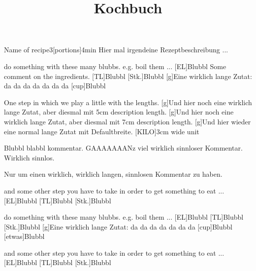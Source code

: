 \documentclass[ngerman,parskip=full]{scrartcl}
\title{Kochbuch}
\begin{document}
\maketitle

\begin{recipe}{Name of recipe}{3}[portions]{4min}
  Hier mal irgendeine Rezeptbeschreibung ...
  \begin{step}{do something with these many blubbs. e.g. boil them ...}
    [EL]{Blubbl}
    Some comment on the ingredients.
    [TL]{Blubbl}
    [Stk.]{Blubbl}
    [g]{Eine wirklich lange Zutat: da da da da da da da}
    [cup]{Blubbl}%
  \end{step}
  \begin{step}{One step in which we play a little with the lengths.}
    [g]{Und hier noch eine wirklich lange Zutat, aber
      diesmal mit 5cm description length.}
    [g]{Und hier noch eine wirklich lange Zutat, aber
      diesmal mit 7cm description length.}
    \resetlengths%
    [g]{Und hier wieder eine normal lange Zutat mit
      Defaultbreite.}
    [\centering KILO]{3cm wide unit}
  \end{step}
  Blubbl blabbl kommentar. GAAAAAAANz viel wirklich sinnloser
  Kommentar. Wirklich sinnlos.\par
  Nur um einen wirklich, wirklich langen, sinnlosen Kommentar zu
  haben.
  \begin{step}{and some other step you have to take in order to get
      something to eat ...}
    [EL]{Blubbl}
    [TL]{Blubbl}
    [Stk.]{Blubbl}
  \end{step}
  \begin{step}{do something with these many blubbs. e.g. boil them ...}
    [EL]{Blubbl}
    [TL]{Blubbl}
    [Stk.]{Blubbl}
    [g]{Eine wirklich lange Zutat: da da da da da da da}
    [cup]{Blubbl}
    [etwas]{Blubbl}
  \end{step}
  \begin{step}{and some other step you have to take in order to get
      something to eat ...}
    [EL]{Blubbl}
    [TL]{Blubbl}
    [Stk.]{Blubbl}
  \end{step}
\end{recipe}
\end{document}

